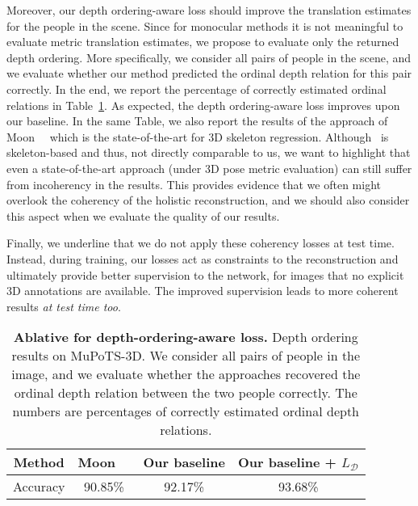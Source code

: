 Moreover, our depth ordering-aware loss should improve the translation estimates for the people in the scene. Since for monocular methods it is not meaningful to evaluate metric translation estimates, we propose to evaluate only the returned depth ordering. More specifically, we consider all pairs of people in the scene, and we evaluate whether our method predicted the ordinal depth relation for this pair correctly. In the end, we report the percentage of correctly estimated ordinal relations in Table~\ref{table:ordering}. As expected, the depth ordering-aware loss improves upon our baseline. In the same Table, we also report the results of the approach of Moon~\etal~\cite{moon2019camera} which is the state-of-the-art for 3D skeleton regression. Although~\cite{moon2019camera} is skeleton-based and thus, not directly comparable to us, we want to highlight that even a state-of-the-art approach (under 3D pose metric evaluation) can still suffer from incoherency in the results. This provides evidence that we often might overlook the coherency of the holistic reconstruction, and we should also consider this aspect when we evaluate the quality of our results.

Finally, we underline that we do not apply these coherency losses at test time. Instead, during training, our losses act as constraints to the reconstruction and ultimately provide better supervision to the network, for images that no explicit 3D annotations are available. The improved supervision leads to more coherent results {\it at test time too}. 


\begin{table}\centering
\footnotesize
	\begin{tabular}{c|c|c|c}
	\toprule
	Method & Moon~\etal~\cite{moon2019camera} & Our baseline & Our baseline + $L_{\mathcal{D}}$ \\
	\midrule
	Accuracy & 90.85\% & 92.17\% & 93.68\%\\
	\bottomrule
	\end{tabular}
	\caption{\textbf{Ablative for depth-ordering-aware loss.} Depth ordering results on MuPoTS-3D. We consider all pairs of people in the image, and we evaluate whether the approaches recovered the ordinal depth relation between the two people correctly. The numbers are percentages of correctly estimated ordinal depth relations. }
	\vspace{-2mm}
	\label{table:ordering}
\end{table}

